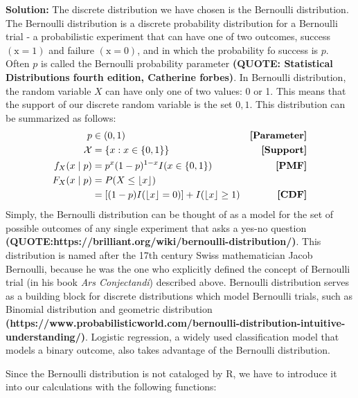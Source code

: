 \documentclass{article}\usepackage[]{graphicx}\usepackage[]{color}
\begin{document}
\begin{enumerate}
\begin{enumerate}
\textbf{Solution:} The discrete distribution we have chosen is the Bernoulli distribution. The Bernoulli distribution  is a discrete probability distribution for a Bernoulli trial - a probabilistic experiment that can have one of two outcomes, success $\mathrm{(x = 1)}$ and failure $\mathrm{(x = 0)}$, and in which the probability fo success is $p$. Often $p$  is called the Bernoulli probability parameter \textbf{(QUOTE: Statistical Distributions fourth edition, Catherine forbes)}. In Bernoulli distribution, the random variable $X$ can have only one of two values: 0 or 1. This means that the support of our discrete random variable is the set $\mathrm{{0, 1}}$. This distribution can be summarized as follows:
\begin{align*}
  p               &\in (0,1)                                                                               &\text{\textbf{[Parameter]}}\\
  \mathcal{X}     & = \{x: x \in \{0,1\}\}                                                                   &\text{\textbf{[Support]}}\\
  f_{X}(x \mid p) & = p^{x} (1-p)^{1-x}I(x \in \{0,1\})                                                      &\text{\textbf{[PMF]}}\\
  F_{X}(x \mid p) & = P(X \leq \left\lfloor x \right\rfloor)\\
                  & = [(1-p)I(\left\lfloor x \right\rfloor = 0)] + I(\left\lfloor x \right\rfloor \geq 1)  &\text{\textbf{[CDF]}}\\
\end{align*}
Simply, the Bernoulli distribution can be thought of as a model for the set of possible outcomes of any single experiment that asks a yes-no question \textbf{(QUOTE:https://brilliant.org/wiki/bernoulli-distribution/)}. This distribution is named after the 17th century Swiss mathematician Jacob Bernoulli, because he was the one who explicitly defined the concept of Bernoulli trial (in his book \emph{Ars Conjectandi}) described above. Bernoulli distribution serves as a building block for discrete distributions which model Bernoulli trials, such as Binomial distribution and geometric distribution \textbf{(https://www.probabilisticworld.com/bernoulli-distribution-intuitive-understanding/)}. Logistic regression, a widely used classification model that models a binary outcome, also takes advantage of the Bernoulli distribution.

Since the Bernoulli distribution is not cataloged by R, we have to introduce it into our calculations with the  following functions:


\end{enumerate}
\end{enumerate}
\end{document}
